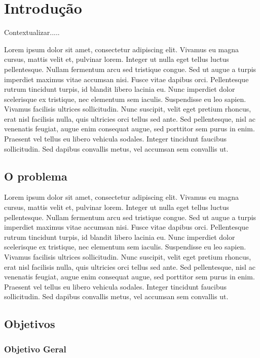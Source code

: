 \chapter{Introdução}

Contextualizar.....

Lorem ipsum dolor sit amet, consectetur adipiscing elit. Vivamus eu magna cursus, mattis velit et, pulvinar lorem. Integer ut nulla eget tellus luctus pellentesque. Nullam fermentum arcu sed tristique congue. Sed ut augue a turpis imperdiet maximus vitae accumsan nisi. Fusce vitae dapibus orci. Pellentesque rutrum tincidunt turpis, id blandit libero lacinia eu. Nunc imperdiet dolor scelerisque ex tristique, nec elementum sem iaculis. Suspendisse eu leo sapien. Vivamus facilisis ultrices sollicitudin. Nunc suscipit, velit eget pretium rhoncus, erat nisl facilisis nulla, quis ultricies orci tellus sed ante. Sed pellentesque, nisl ac venenatis feugiat, augue enim consequat augue, sed porttitor sem purus in enim. Praesent vel tellus eu libero vehicula sodales. Integer tincidunt faucibus sollicitudin. Sed dapibus convallis metus, vel accumsan sem convallis ut.

\section{O problema}

Lorem ipsum dolor sit amet, consectetur adipiscing elit. Vivamus eu magna cursus, mattis velit et, pulvinar lorem. Integer ut nulla eget tellus luctus pellentesque. Nullam fermentum arcu sed tristique congue. Sed ut augue a turpis imperdiet maximus vitae accumsan nisi. Fusce vitae dapibus orci. Pellentesque rutrum tincidunt turpis, id blandit libero lacinia eu. Nunc imperdiet dolor scelerisque ex tristique, nec elementum sem iaculis. Suspendisse eu leo sapien. Vivamus facilisis ultrices sollicitudin. Nunc suscipit, velit eget pretium rhoncus, erat nisl facilisis nulla, quis ultricies orci tellus sed ante. Sed pellentesque, nisl ac venenatis feugiat, augue enim consequat augue, sed porttitor sem purus in enim. Praesent vel tellus eu libero vehicula sodales. Integer tincidunt faucibus sollicitudin. Sed dapibus convallis metus, vel accumsan sem convallis ut.

\section{Objetivos}

\subsection{ Objetivo Geral}

